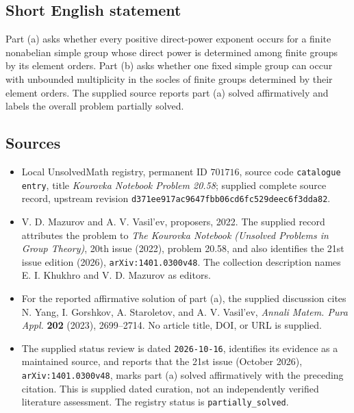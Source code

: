 \documentclass[11pt]{article}
\begin{document}
\subsection{Short English statement}
Part (a) asks whether every positive direct-power exponent occurs for a finite nonabelian simple group whose direct power is determined among finite groups by its element orders. Part (b) asks whether one fixed simple group can occur with unbounded multiplicity in the socles of finite groups determined by their element orders. The supplied source reports part (a) solved affirmatively and labels the overall problem partially solved.
\subsection{Sources}
\begin{itemize}
\item Local UnsolvedMath registry, permanent ID \(701716\), source code \texttt{catalogue entry}, title \emph{Kourovka Notebook Problem 20.58}; supplied complete source record, upstream revision \texttt{d371ee917ac9647fbb06cd6fc529deec6f3dda82}.
\item V. D. Mazurov and A. V. Vasil'ev, proposers, 2022. The supplied record attributes the problem to \emph{The Kourovka Notebook (Unsolved Problems in Group Theory)}, 20th issue (2022), problem 20.58, and also identifies the 21st issue edition (2026), \texttt{arXiv:1401.0300v48}. The collection description names E. I. Khukhro and V. D. Mazurov as editors.
\item For the reported affirmative solution of part (a), the supplied discussion cites N. Yang, I. Gorshkov, A. Staroletov, and A. V. Vasil'ev, \emph{Annali Matem. Pura Appl.} \textbf{202} (2023), 2699--2714. No article title, DOI, or URL is supplied.
\item The supplied status review is dated \texttt{2026-10-16}, identifies its evidence as a maintained source, and reports that the 21st issue (October 2026), \texttt{arXiv:1401.0300v48}, marks part (a) solved affirmatively with the preceding citation. This is supplied dated curation, not an independently verified literature assessment. The registry status is \texttt{partially\_solved}.
\end{itemize}
\end{document}
